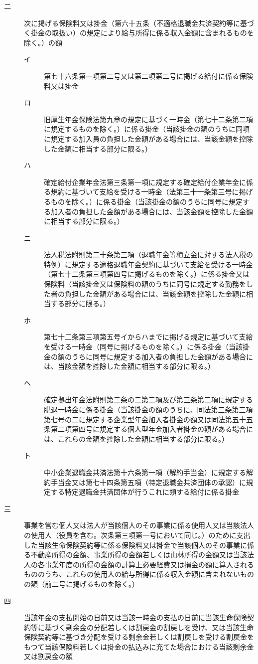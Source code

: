 \documentclass[twocolumn,a4j,10pt]{ltjtarticle}
\begin{document}
\begin{description}
\begin{description}
\item[二]次に掲げる保険料又は掛金（第六十五条（不適格退職金共済契約等に基づく掛金の取扱い）の規定により給与所得に係る収入金額に含まれるものを除く。）の額
\begin{description}
\item[イ]第七十六条第一項第二号又は第二項第二号に掲げる給付に係る保険料又は掛金
\item[ロ]旧厚生年金保険法第九章の規定に基づく一時金（第七十二条第二項に規定するものを除く。）に係る掛金（当該掛金の額のうちに同項に規定する加入員の負担した金額がある場合には、当該金額を控除した金額に相当する部分に限る。）
\item[ハ]確定給付企業年金法第三条第一項に規定する確定給付企業年金に係る規約に基づいて支給を受ける一時金（法第三十一条第三号に掲げるものを除く。）に係る掛金（当該掛金の額のうちに同号に規定する加入者の負担した金額がある場合には、当該金額を控除した金額に相当する部分に限る。）
\item[ニ]法人税法附則第二十条第三項（退職年金等積立金に対する法人税の特例）に規定する適格退職年金契約に基づいて支給を受ける一時金（第七十二条第三項第四号に掲げるものを除く。）に係る掛金又は保険料（当該掛金又は保険料の額のうちに同号に規定する勤務をした者の負担した金額がある場合には、当該金額を控除した金額に相当する部分に限る。）
\item[ホ]第七十二条第三項第五号イからハまでに掲げる規定に基づいて支給を受ける一時金（同号に掲げるものを除く。）に係る掛金（当該掛金の額のうちに同号に規定する加入者の負担した金額がある場合には、当該金額を控除した金額に相当する部分に限る。）
\item[ヘ]確定拠出年金法附則第二条の二第二項及び第三条第二項に規定する脱退一時金に係る掛金（当該掛金の額のうちに、同法第三条第三項第七号の二に規定する企業型年金加入者掛金の額又は同法第五十五条第二項第四号に規定する個人型年金加入者掛金の額がある場合には、これらの金額を控除した金額に相当する部分に限る。）
\item[ト]中小企業退職金共済法第十六条第一項（解約手当金）に規定する解約手当金又は第七十四条第五項（特定退職金共済団体の承認）に規定する特定退職金共済団体が行うこれに類する給付に係る掛金
\end{description}
\item[三]事業を営む個人又は法人が当該個人のその事業に係る使用人又は当該法人の使用人（役員を含む。次条第三項第一号において同じ。）のために支出した当該生命保険契約等に係る保険料又は掛金で当該個人のその事業に係る不動産所得の金額、事業所得の金額若しくは山林所得の金額又は当該法人の各事業年度の所得の金額の計算上必要経費又は損金の額に算入されるもののうち、これらの使用人の給与所得に係る収入金額に含まれないものの額（前二号に掲げるものを除く。）
\item[四]当該年金の支払開始の日前又は当該一時金の支払の日前に当該生命保険契約等に基づく剰余金の分配若しくは割戻金の割戻しを受け、又は当該生命保険契約等に基づき分配を受ける剰余金若しくは割戻しを受ける割戻金をもつて当該保険料若しくは掛金の払込みに充てた場合における当該剰余金又は割戻金の額
\end{description}
\end{description}
\end{document}
